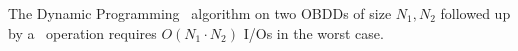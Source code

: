 \begin{theorem} \label{thm:apply_io_worst_case}

  The Dynamic Programming \Apply\ algorithm on two OBDDs of size $N_1, N_2$
  followed up by a \Reduce\ operation requires $O(N_1 \cdot N_2)$ I/Os in the
  worst case.
\end{theorem}




